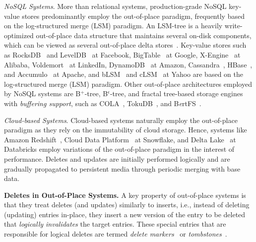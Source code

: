 \documentclass[11pt,dvipdfmx]{article}
\newcommand\Paragraph[1]{\vspace{0.02in}  \noindent \textbf{#1.}}
\begin{document}
\textit{NoSQL Systems}.
More than relational systems, production-grade NoSQL key-value stores predominantly employ the 
out-of-place paradigm, frequently based on the log-structured merge (LSM) paradigm.
An LSM-tree is a heavily write-optimized out-of-place data structure that maintains several on-disk components, which can be viewed as several out-of-place delta stores~\cite{ONeil1996,Dayan2017,Idreos2019,Luo2020b,Sarkar2022b,Zheng2018}.
Key-value stores such as RocksDB~\cite{Dong2017,FacebookRocksDB} and  LevelDB~\cite{GoogleLevelDB} at Facebook, BigTable~\cite{Chang2006} at Google, X-Engine~\cite{Huang2019,Yang2020} at Alibaba, Voldemort~\cite{LinkedInVoldemort} at LinkedIn, DynamoDB~\cite{DeCandia2007} at Amazon, Cassandra~\cite{ApacheCassandra}, HBase~\cite{ApacheHBase}, and Accumulo~\cite{ApacheAccumulo} at Apache, and bLSM~\cite{Sears2012} and cLSM~\cite{Golan-Gueta2015} at Yahoo are based on the log-structured merge (LSM) paradigm. 
Other out-of-place architectures employed by NoSQL systems are B$^+$-tree, B$^\epsilon$-tree, and fractal tree-based storage engines with \emph{buffering support}, such as COLA~\cite{Bender2000}, TokuDB~\cite{Kuszmaul2014}, and 
B\textit{e}rtFS~\cite{Bender2015,Jannen2015}. 

\textit{Cloud-based Systems}.
Cloud-based systems naturally employ the out-of-place paradigm as they rely on the 
immutability of cloud storage. Hence, systems like Amazon 
Redshift~\cite{AmazonRedshift,Gupta2015}, Cloud Data Platform~\cite{Dageville2016} at 
Snowflake, and Delta Lake~\cite{Databricks,Databricks2021} at Databricks employ variations
of the out-of-place paradigm in the interest of performance. 
Deletes and updates are initially performed logically and are gradually propagated to 
persistent media through periodic merging with base data. 

\Paragraph{Deletes in Out-of-Place Systems}
A key property of out-of-place systems is that they treat deletes (and updates) similarly to 
inserts, i.e., instead of deleting (updating) entries in-place, they insert a new version of 
the entry to be deleted that \textit{logically invalidates} the target entries. 
These special entries that are responsible for logical deletes are termed \textit{delete 
markers}~\cite{Lamb2012} or \textit{tombstones}~\cite{Dong2017,Sarkar2020}. 
\end{document}
